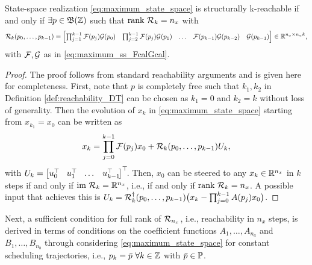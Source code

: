\begin{lemma}
\label{lem:reachability_matrix}
    State-space realization \eqref{eq:maximum_state_space} is structurally k-reachable if and only if $\exists p\in \mathfrak{B}(\mathbb{Z})$ such that $\textrm{rank}\ \mathcal{R}_k = n_x$ with
    \begin{equation}
        \Rcal_{k}(p_0,\ldots,p_{k-1}) = 
        \begin{bmatrix}
            \prod_{j=1}^{k-1} \Fcal(p_j) \Gcal(p_0) & \prod_{j=2}^{k-1} \Fcal(p_j) \Gcal(p_1) & \hdots & \Fcal(p_{k-1}) \Gcal(p_{k-2}) & \Gcal(p_{k-1})
        \end{bmatrix}
        \in \mathbb{R}^{n_x \times n_u k}, \label{eq:reach_matrix_generic}%
    \end{equation}%
    with $\mathcal{F},\mathcal{G}$ as in \eqref{eq:maximum_ss_FcalGcal}.
\end{lemma}%
\begin{proof}
The proof follows from standard reachability arguments and is given here for completeness. First, note that $p$ is completely free such that $k_1,k_2$ in Definition \ref{def:reachability_DT} can be chosen as $k_1=0$ and $k_2=k$ without loss of generality. Then the evolution of $x_k$ in \eqref{eq:maximum_state_space} starting from $x_{k_1}  = x_0$ can be written as
    \begin{equation}
        x_k = \prod_{j=0}^{k-1} \mathcal{F}(p_j) x_0 + \mathcal{R}_k(p_0,\ldots,p_{k-1}) U_k,
    \end{equation}
    with $U_k = \begin{bmatrix} u_0^\top\! & u_1^\top\! & \ldots & u_{k-1}^\top\! \end{bmatrix}^\top\!$. Then, $x_0$ can be steered to any $x_k\in\mathbb{R}^{n_x}$ in $k$ steps if and only if $\textrm{im}\ \mathcal{R}_k = \mathbb{R}^{n_x}$, i.e., if and only if $\textrm{rank}\ \mathcal{R}_k = n_x$. A possible input that achieves this is $U_k = \mathcal{R}_k^{\dag}(p_0,\ldots,p_{k-1}) \big(x_k - \prod_{j=0}^{k-1} A(p_j) x_0\big)$.
\end{proof}
Next, a sufficient condition for full rank of $\mathcal{R}_{n_x}$, i.e., reachability in $n_x$ steps, is derived in terms of conditions on the coefficient functions $A_1,\ldots,A_{n_a}$ and $B_1,\ldots,B_{n_b}$ through considering \eqref{eq:maximum_state_space} for constant scheduling trajectories, i.e., $p_k = \bar{p} \ \forall k \in \mathbb{Z}$ with $\bar{p}\in\mathbb{P}$. 

